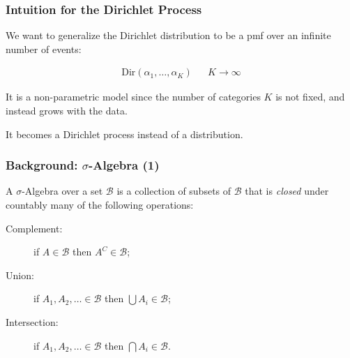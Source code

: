 \documentclass[12pt]{beamer}
\newcommand{\Dir}{\text{Dir}}
\begin{document}
\begin{frame}
    \frametitle{Intuition for the Dirichlet Process}

    We want to generalize the Dirichlet distribution to be a pmf over an
    infinite number of events:

    \bigskip

    \begin{align*}
        \Dir\left(\alpha_1, \dots, \alpha_K\right) && K \to \infty
    \end{align*}

    \bigskip

    It is a \alert{non-parametric} model since the number of categories $K$
    is not fixed, and instead grows with the data.

    \bigskip

    \pause
    
    It becomes a \alert{Dirichlet process} instead of a distribution.
\end{frame}


\begin{frame}
    \frametitle{Background: $\sigma$-Algebra (1)}

    A \alert{$\sigma$-Algebra} over a set $\mathcal{B}$ is a collection of subsets
    of $\mathcal{B}$ that is \emph{closed} under countably many of the
    following operations:

    \bigskip

    \begin{description}
        \item[Complement:] if $A \in \mathcal{B}$ then $A^C \in \mathcal{B}$;

            \medskip

        \item[Union:] if $A_1, A_2, \dots \in \mathcal{B}$ then $\bigcup A_i \in \mathcal{B}$;

            \medskip

        \item[Intersection:] if $A_1, A_2, \dots \in \mathcal{B}$ then $\bigcap
            A_i \in \mathcal{B}$.
    \end{description}
\end{frame}
\end{document}
